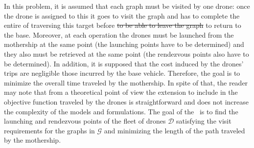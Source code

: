 \noindent
{}
In this problem, it is assumed that each graph must be visited by one drone: once the drone is assigned to this  it goes to visit the graph and has to complete the entire  of traversing this target before \sout{to be able to leave the graph} to return to the base. Moreover, at each operation\RE{,} the drones must be launched from the mothership at the same point (the launching points have to be determined) and they also must be retrieved at the same point (the rendezvous points also have to be determined).
  In addition, it is supposed that the cost induced by the drones' trips are negligible  those incurred by the base vehicle. Therefore, the goal is to minimize the overall time traveled by the mothership. In spite of that, the reader may note that from a theoretical point of view\RE{,} the extension to include in the objective function  traveled by the drones is straightforward and does not increase the complexity of the models and formulations.
\noindent
The goal of the \AMD \ is to find the launching and rendezvous points of the fleet of drones $\mathcal D$ satisfying the visit requirements for the graphs in $\mathcal G$ and minimizing the length of the path traveled by the mothership.\\

\noindent
